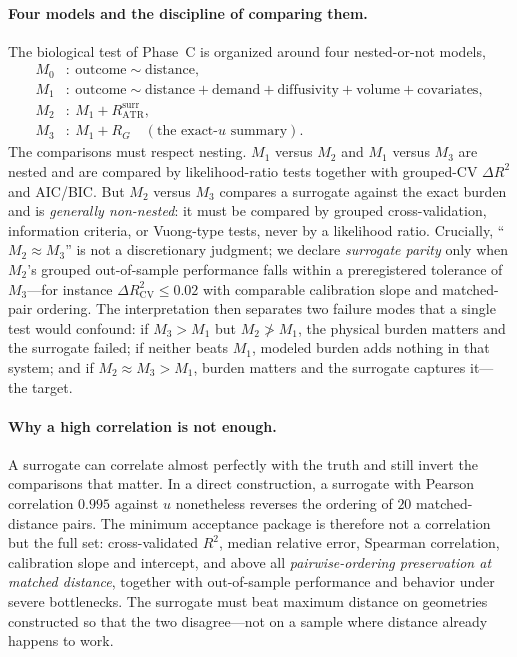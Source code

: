 \documentclass[11pt]{article}
\theoremstyle{remark}
\newcommand{\RATR}{R_{\mathrm{ATR}}}
\newcommand{\RG}{R_{G}}
\begin{document}
\paragraph{Four models and the discipline of comparing them.} The biological test
of Phase~C is organized around four nested-or-not models,
\begin{align*}
M_0&:\ \text{outcome}\sim\text{distance},\\
M_1&:\ \text{outcome}\sim\text{distance}+\text{demand}+\text{diffusivity}
        +\text{volume}+\text{covariates},\\
M_2&:\ M_1+\RATR^{\text{surr}},\\
M_3&:\ M_1+\RG\quad(\text{the exact-}u\text{ summary}).
\end{align*}
The comparisons must respect nesting. $M_1$ versus $M_2$ and $M_1$ versus $M_3$
are nested and are compared by likelihood-ratio tests together with grouped-CV
$\Delta R^2$ and AIC/BIC. But $M_2$ versus $M_3$ compares a surrogate against the
exact burden and is \emph{generally non-nested}: it must be compared by grouped
cross-validation, information criteria, or Vuong-type tests, never by a likelihood
ratio. Crucially, ``$M_2\approx M_3$'' is not a discretionary judgment; we declare
\emph{surrogate parity} only when $M_2$'s grouped out-of-sample performance falls
within a preregistered tolerance of $M_3$---for instance $\Delta R^2_{\mathrm{CV}}
\le0.02$ with comparable calibration slope and matched-pair ordering. The
interpretation then separates two failure modes that a single test would confound:
if $M_3>M_1$ but $M_2\not>M_1$, the physical burden matters and the surrogate
failed; if neither beats $M_1$, modeled burden adds nothing in that system; and if
$M_2\approx M_3>M_1$, burden matters and the surrogate captures it---the target.

\paragraph{Why a high correlation is not enough.} A surrogate can correlate almost
perfectly with the truth and still invert the comparisons that matter. In a direct
construction, a surrogate with Pearson correlation $0.995$ against $u$ nonetheless
reverses the ordering of $20$ matched-distance pairs. The minimum acceptance
package is therefore not a correlation but the full set: cross-validated $R^2$,
median relative error, Spearman correlation, calibration slope and intercept, and
above all \emph{pairwise-ordering preservation at matched distance}, together with
out-of-sample performance and behavior under severe bottlenecks. The surrogate
must beat maximum distance on geometries constructed so that the two disagree---not
on a sample where distance already happens to work.
\end{document}
